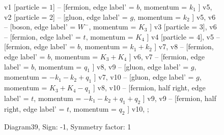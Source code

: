 \documentclass{revtex4}
\begin{document}
\begin{figure}[!htb]
\begin{center}
{    %
v1 [particle = \(1\)] -- [fermion, edge label' = \(b\), momentum = \(k_{1}\) ] v5, 
v2 [particle = \(2\)] -- [gluon, edge label' = \(g\), momentum = \(k_{2}\) ] v5, 
v6 -- [boson, edge label' = \(W^{-}\), momentum = \(K_{3}\) ] v3 [particle = \(3\)], 
v6 -- [fermion, edge label' = \(t\), momentum = \(K_{4}\) ] v4 [particle = \(4\)], 
v5 -- [fermion, edge label' = \(b\), momentum = \(k_{1} + k_{2}\) ] v7, 
v8 -- [fermion, edge label' = \(b\), momentum = \(K_{3} + K_{4}\) ] v6, 
v7 -- [fermion, edge label' = \(b\), momentum = \(q_{1}\) ] v8, 
v9 -- [gluon, edge label' = \(g\), momentum = \(-k_{1} - k_{2} + q_{1}\) ] v7, 
v10 -- [gluon, edge label' = \(g\), momentum = \(K_{3} + K_{4} - q_{1}\) ] v8, 
v10 -- [fermion, half right, edge label' = \(t\), momentum = \(-k_{1} - k_{2} + q_{1} + q_{2}\) ] v9, 
v9 -- [fermion, half right, edge label' = \(t\), momentum = \(q_{2}\) ] v10, 
};
\end{center}
\caption{Diagram39, Sign: -1, Symmetry factor: 1}
\end{figure}
\newpage
\end{document}
